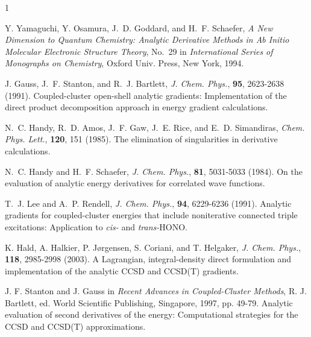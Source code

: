 \documentclass[12pt]{article}
\begin{document}
\begin{thebibliography}{1}

Y. Yamaguchi, Y. Osamura, J.~D. Goddard, and H.~F. Schaefer, \textit{A New
  Dimension to Quantum Chemistry: Analytic Derivative Methods in {\em Ab
  Initio} Molecular Electronic Structure Theory}, No.~29 in
  \textit{International Series of Monographs on Chemistry}, Oxford Univ. Press,
  New York, 1994.

J. Gauss, J.~F. Stanton, and R.~J. Bartlett, \textit{J. Chem. Phys.}, {\bf 95},
   2623-2638  (1991).
Coupled-cluster open-shell analytic gradients: Implementation of the direct
  product decomposition approach in energy gradient calculations.

N.~C. Handy, R.~D. Amos, J.~F. Gaw, J.~E. Rice, and E.~D. Simandiras,
  \textit{Chem. Phys. Lett.}, {\bf 120},  151  (1985).
The elimination of singularities in derivative calculations.

N.~C. Handy and H.~F. Schaefer, \textit{J. Chem. Phys.}, {\bf 81},  5031-5033
  (1984).
On the evaluation of analytic energy derivatives for correlated wave functions.

T.~J. Lee and A.~P. Rendell, \textit{J. Chem. Phys.}, {\bf 94},  6229-6236
  (1991).
Analytic gradients for coupled-cluster energies that include noniterative
  connected triple excitations: Application to {\em cis-} and {\em trans-}HONO.

K. Hald, A. Halkier, P. J{\o}rgensen, S. Coriani, and T. Helgaker, \textit{J.
  Chem. Phys.}, {\bf 118},  2985-2998  (2003).
A Lagrangian, integral-density direct formulation and implementation of the
  analytic CCSD and CCSD(T) gradients.

J. F. Stanton and J. Gauss in
\textit{Recent Advances in Coupled-Cluster Methods}, R. J. Bartlett, ed. World Scientific Publishing, Singapore,
1997, pp. 49-79.
Analytic evaluation of second derivatives of the energy: Computational strategies for the CCSD and CCSD(T) approximations.

\end{thebibliography}
\end{document}
